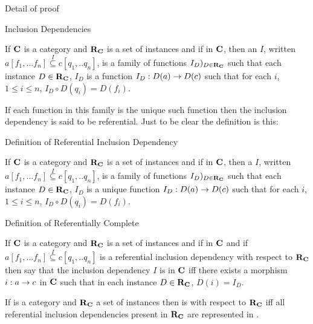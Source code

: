 \begin{frame}{Detail of proof}
\end{frame}

\begin{frame}{Inclusion Dependencies}
\begin{definition}
If $\textbf{C}$ is a category and $\textbf{R}_{\textbf{C}}$ is a set of instances 
and if
\fnsourceqnsource
in $\textbf{C}$, then an  $I$, written $a[f_1,...f_n] \overset{I}{\subseteq} c[q_1,..q_n]$, is a family of functions $I_D)_{D \in \textbf{R}_{\textbf{C}}}$
such that each instance $D \in \textbf{R}_{\textbf{C}}$, $I_D$ is a function $I_D : D(a) \rightarrow D(c)$ such that
for each $i$, $1 \leq i \le n$, $I_D \circ D(q_i) = D(f_i)$.
\end{definition}

If each function in this family is the unique such function then the inclusion dependency is said to be referential. Just to be clear the definition is this:
\end{frame}

\begin{frame}{Definition of Referential Inclusion Dependency}
\begin{definition}
If $\textbf{C}$ is a category and $\textbf{R}_{\textbf{C}}$ is a set of instances 
and if
\fnsourceqnsource
in $\textbf{C}$, then a  $I$, written $a[f_1,...f_n] \overset{I}{\subseteq} c[q_1,..q_n]$, is a family of functions $I_D)_{D \in \textbf{R}_{\textbf{C}}}$
such that each instance $D \in \textbf{R}_{\textbf{C}}$, $I_D$ is a unique function $I_D : D(a) \rightarrow D(c)$ such that
for each $i$, $1 \leq i \le n$, $I_D \circ D(q_i) = D(f_i)$.
\end{definition}
\end{frame}

\begin{frame}{Definition of Referentially Complete}
\begin{definition}
If $\textbf{C}$ is a category and $\textbf{R}_{\textbf{C}}$ is a set of instances and if
\fnsourceqnsource
in $\textbf{C}$ and if $a[f_1,...f_n] \overset{I}{\subseteq} c[q_1,..q_n]$ is a referential inclusion dependency
with respect  to $\textbf{R}_{\textbf{C}}$ then say that the inclusion dependency $I$ is  in $\textbf{C}$
iff there exists a morphism $i:a \rightarrow c$ in $\textbf{C}$ such that in each instance $D \in \textbf{R}_{\textbf{C}}$, $D(i) = I_D$. 
\end{definition}
If \catcw is a category and $\textbf{R}_{\textbf{C}}$ a set of instances then 
\catcw is  with respect to $\textbf{R}_{\textbf{C}}$ 
iff all referential inclusion dependencies present in $\textbf{R}_{\textbf{C}}$ are represented in \catc.
\end{frame}

